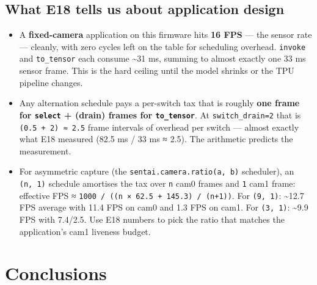 \subsection{What E18 tells us about application
design}\label{what-e18-tells-us-about-application-design}

\begin{itemize}
\tightlist
\item
  A \textbf{fixed-camera} application on this firmware hits \textbf{16
  FPS} --- the sensor rate --- cleanly, with zero cycles left on the
  table for scheduling overhead. \texttt{invoke} and \texttt{to\_tensor}
  each consume \textasciitilde31 ms, summing to almost exactly one 33 ms
  sensor frame. This is the hard ceiling until the model shrinks or the
  TPU pipeline changes.
\item
  Any alternation schedule pays a per-switch tax that is roughly
  \textbf{one frame for \texttt{select} + (drain) frames for
  \texttt{to\_tensor}}. At \texttt{switch\_drain=2} that is
  \texttt{(0.5\ +\ 2)\ ≈\ 2.5} frame intervals of overhead per switch
  --- almost exactly what E18 measured (82.5 ms / 33 ms ≈ 2.5). The
  arithmetic predicts the measurement.
\item
  For asymmetric capture (the \texttt{sentai.camera.ratio(a,\ b)}
  scheduler), an \texttt{(n,\ 1)} schedule amortises the tax over
  \texttt{n} cam0 frames and \texttt{1} cam1 frame: effective FPS ≈
  \texttt{1000\ /\ ((n\ ×\ 62.5\ +\ 145.3)\ /\ (n+1))}. For
  \texttt{(9,\ 1)}: \textasciitilde12.7 FPS average with 11.4 FPS on
  cam0 and 1.3 FPS on cam1. For \texttt{(3,\ 1)}: \textasciitilde9.9 FPS
  with 7.4/2.5. Use E18 numbers to pick the ratio that matches the
  application's cam1 liveness budget.
\end{itemize}

\section{Conclusions}\label{conclusions}

